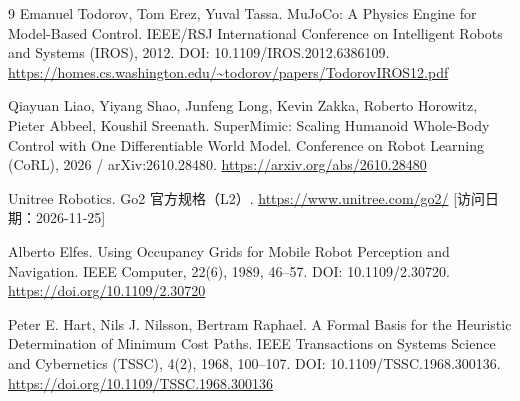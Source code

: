 \documentclass[10pt,a4paper,UTF8,fontset=fandol]{ctexart}
\begin{document}
\begin{thebibliography}{9}
  \small
  Emanuel Todorov, Tom Erez, Yuval Tassa. MuJoCo: A Physics Engine for Model-Based Control. IEEE/RSJ International Conference on Intelligent Robots and Systems (IROS), 2012. DOI: 10.1109/IROS.2012.6386109. \url{https://homes.cs.washington.edu/~todorov/papers/TodorovIROS12.pdf}

  Qiayuan Liao, Yiyang Shao, Junfeng Long, Kevin Zakka, Roberto Horowitz, Pieter Abbeel, Koushil Sreenath. SuperMimic: Scaling Humanoid Whole-Body Control with One Differentiable World Model. Conference on Robot Learning (CoRL), 2026 / arXiv:2610.28480. \url{https://arxiv.org/abs/2610.28480}

  Unitree Robotics. Go2 官方规格（L2）. \url{https://www.unitree.com/go2/} [访问日期：2026-11-25]

  Alberto Elfes. Using Occupancy Grids for Mobile Robot Perception and Navigation. IEEE Computer, 22(6), 1989, 46–57. DOI: 10.1109/2.30720. \url{https://doi.org/10.1109/2.30720}

  Peter E. Hart, Nils J. Nilsson, Bertram Raphael. A Formal Basis for the Heuristic Determination of Minimum Cost Paths. IEEE Transactions on Systems Science and Cybernetics (TSSC), 4(2), 1968, 100–107. DOI: 10.1109/TSSC.1968.300136. \url{https://doi.org/10.1109/TSSC.1968.300136}

\end{thebibliography}
\end{document}
